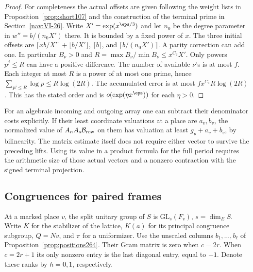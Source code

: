 \documentclass[a4paper,11pt]{article}
\theoremstyle{definition}
\theoremstyle{remark}
\numberwithin{equation}{section}
\begin{document}
\begin{proof}
For completeness the actual offsets are given following the
weight lists in Proposition~\ref{prop:short107} and the
construction of the terminal prime in Section~\ref{nav:VI-26}. Write
\(X'=\exp(x^{\eps/3})\) and let \(n_0\) be the degree parameter in
\(w''=b/(n_0 X')\) there. It is bounded by a fixed power of \(x\). The three initial offsets are
\(\lceil xb/X'\rceil+\lfloor b/X'\rfloor\),
\(\lceil b\rceil\), and \(\lceil b/(n_0X')\rceil\).
A parity correction can add one. In particular \(B_\nu>0\)
and \(R=\max B_\nu/\min B_\nu\le x^{C_2}X'\).
Only powers \(p^j\le R\) can have a positive difference.
The number of available \(\nu\)'s is at most \(f\). Each
integer at most \(R\) is a power of at most one prime, hence
\(\sum_{p^j\le R}\log p\le R\log(2R)\). The accumulated
error is at most \(fx^{C_1}R\log(2R)\). This has the stated
order and is \(o(\exp(\eta x^\eps))\) for each \(\eta>0\).
\end{proof}

For an algebraic incoming and outgoing array one can subtract
their denominator costs explicitly. If their least coordinate
valuations at a place are \(a_v,b_v\), the normalized value
of \(A_n A_s\mathcal B_{\rm row}\) on them has valuation at least
\(g_p+a_v+b_v\), by bilinearity. The matrix estimate itself
does not require either vector to survive the preceding lifts.
Using its value in a product formula for the full period requires
the arithmetic size of those actual vectors and a nonzero
contraction with the signed terminal projection.

\subsection{Congruences for paired frames}\label{nav:II-52}
At a marked place \(v\), the split unitary group of \(S\) is
\(\mathrm{GL}_s(F_v)\), \(s=\dim_E S\). Write \(K\) for the
stabilizer of the lattice, \(K(a)\) for its principal congruence
subgroup, \(Q=Nv\), and \(\pi\) for a uniformizer. Use the
unscaled columns \(b_1,\ldots,b_\ell\) of
Proposition~\ref{prop:positions264}. Their Gram matrix is zero
when \(c=2r\). When \(c=2r+1\) its only nonzero entry is the
last diagonal entry, equal to \(-1\). Denote these ranks by
\(h=0,1\), respectively.
\end{document}
